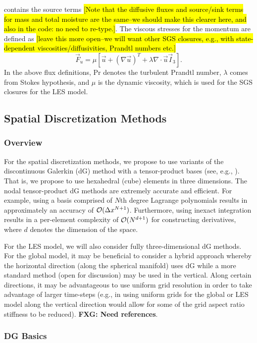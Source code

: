 \documentclass{article}
\begin{document}
contains the source terms \hl{[Note that the diffusive fluxes and source/sink terms for mass and total moisture are the same--we should make this clearer here, and also in the code: no need to re-type.]}. The viscous stresses for the momentum are defined as \hl{[leave this more open--we will want other SGS closures, e.g., with state-dependent viscosities/diffusivities, Prandtl numbers etc.]}
\[
\vec{F}_u = \mu \left[ \vec{u} + \left( \nabla \vec{u} \right)^T + \lambda \nabla \cdot \vec{u} \vec{I}_3 \right].
\]
In the above flux definitions, $\mathrm{Pr}$ denotes the turbulent Prandtl number, $\lambda$ comes from Stokes hypothesis, and $\mu$ is the dynamic viscosity, which is used for the SGS closures for the LES model.

\subsection{Spatial Discretization Methods}

\subsubsection{Overview}
For the spatial discretization methods, we propose to use variants of the discontinuous Galerkin (dG) method with a tensor-product bases (see, e.g., \citet{giraldo:2008a, abdi:2016}). That is, we propose to use hexahedral (cube) elements in three dimensions.  The nodal tensor-product dG methods are extremely accurate and efficient.  For example, using a basis comprised of $N$th degree Lagrange polynomials results in approximately an accuracy of $\mathcal{O}(\Delta x^{N+1})$. Furthermore, using inexact integration results in a per-element complexity of $\mathcal{O}(N^{d+1})$ for constructing derivatives, where $d$ denotes the dimension of the space. 

For the LES model, we will also consider fully three-dimensional dG methods. For the global model, it may be beneficial to consider a hybrid approach whereby the horizontal direction (along the spherical manifold) uses dG while a more standard method (open for discussion) may be used in the vertical.  Along certain directions, it may be advantageous to use uniform grid resolution in order to take advantage of larger time-steps (e.g., in using uniform grids for the global or LES model along the vertical direction would allow for some of the grid aspect ratio stiffness to be reduced).  \textbf{FXG: Need references}.

\subsubsection{DG Basics}
\end{document}

